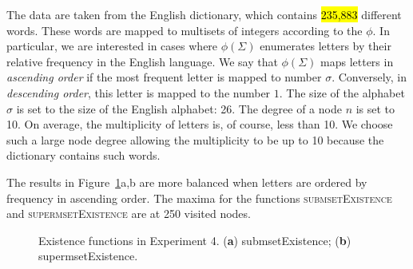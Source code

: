 \documentclass[algorithms,article,accept,pdftex,moreauthors]{Definitions/mdpi}
\begin{document}
The data are taken from the English dictionary, which contains \hl{235,883} different words. 
These words are mapped to multisets of integers according to the $\phi.$ In 
particular, we are interested in cases where $\phi(\Sigma)$ enumerates 
letters by their relative frequency in the English language. We say that $\phi(\Sigma)$ 
maps letters in \emph{ascending order} if the most frequent letter is mapped to 
number $\sigma.$ Conversely, in \emph{descending order}, this letter is mapped to 
the number $1.$ The size of the alphabet $\sigma$ is set to the size of the English 
alphabet: 26. The degree of a node $n$ is set to 10. On average, the multiplicity 
of letters is, of course, less than 10. We choose such a large node degree allowing 
the multiplicity to be up to 10 because the dictionary contains such words. 


%

The results in Figure~\ref{fig:e4m1}a,b are more balanced when 
letters are ordered by frequency in ascending order. The maxima for the functions 
\textsc{submsetExistence} and \textsc{supermsetExistence} are at 250 visited nodes. 

\begin{figure}[H]

\caption{Existence functions in Experiment 4. (\textbf{a}) submsetExistence; (\textbf{b}) supermsetExistence. \label{fig:e4m1}}
\end{figure}
\end{document}
